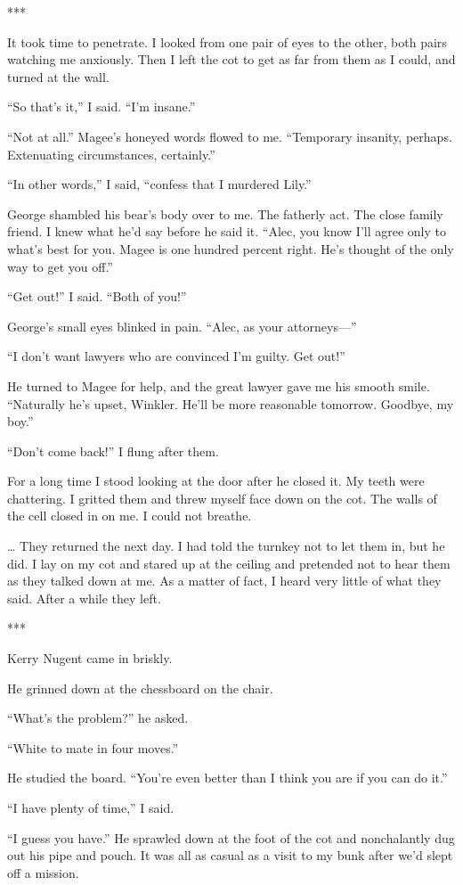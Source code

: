 \documentclass{novel}
\begin{document}
{***

It took time to penetrate. I looked from one pair of eyes to the other, both pairs watching me anxiously. Then I left the cot to get as far from them as I could, and turned at the wall.

“So that’s it,” I said. “I’m insane.”

“Not at all.” Magee’s honeyed words flowed to me. “Temporary insanity, perhaps. Extenuating circumstances, certainly.”

“In other words,” I said, “confess that I murdered Lily.”

George shambled his bear’s body over to me. The fatherly act. The close family friend. I knew what he’d say before he said it. “Alec, you know I’ll agree only to what’s best for you. Magee is one hundred percent right. He’s thought of the only way to get you off.”

“Get out!” I said. “Both of you!”

George’s small eyes blinked in pain. “Alec, as your attorneys—”

“I don’t want lawyers who are convinced I’m guilty. Get out!”

He turned to Magee for help, and the great lawyer gave me his smooth smile. “Naturally he’s upset, Winkler. He’ll be more reasonable tomorrow. Goodbye, my boy.”

“Don’t come back!” I flung after them.

For a long time I stood looking at the door after he closed it. My teeth were chattering. I gritted them and threw myself face down on the cot. The walls of the cell closed in on me. I could not breathe.

… They returned the next day. I had told the turnkey not to let them in, but he did. I lay on my cot and stared up at the ceiling and pretended not to hear them as they talked down at me. As a matter of fact, I heard very little of what they said. After a while they left.

***

Kerry Nugent came in briskly.

He grinned down at the chessboard on the chair.

“What’s the problem?” he asked.

“White to mate in four moves.”

He studied the board. “You’re even better than I think you are if you can do it.”

“I have plenty of time,” I said.

“I guess you have.” He sprawled down at the foot of the cot and nonchalantly dug out his pipe and pouch. It was all as casual as a visit to my bunk after we’d slept off a mission.

}
\end{document}
